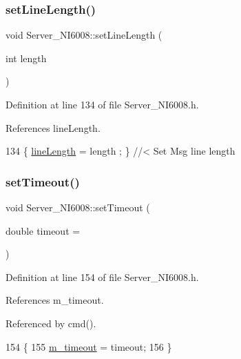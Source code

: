 \subsubsection{\texorpdfstring{set\+Line\+Length()}{setLineLength()}}
{\footnotesize\ttfamily void Server\+\_\+\+N\+I6008\+::set\+Line\+Length (\begin{DoxyParamCaption}\item[{int}]{length }\end{DoxyParamCaption})\hspace{0.3cm}{\ttfamily [inline]}}



Definition at line 134 of file Server\+\_\+\+N\+I6008.\+h.



References line\+Length.


\begin{DoxyCode}
134 \{ \hyperlink{classServer__NI6008_a88ff64de4d8715d849b06c2457d13e17}{lineLength} = length ; \} \textcolor{comment}{//< Set Msg line length}
\end{DoxyCode}
\mbox{\label{classServer__NI6008_ade018df1c5afac06e6d528536635ba48}} 
\subsubsection{\texorpdfstring{set\+Timeout()}{setTimeout()}}
{\footnotesize\ttfamily void Server\+\_\+\+N\+I6008\+::set\+Timeout (\begin{DoxyParamCaption}\item[{double}]{timeout = {} }\end{DoxyParamCaption})\hspace{0.3cm}{\ttfamily [inline]}}



Definition at line 154 of file Server\+\_\+\+N\+I6008.\+h.



References m\+\_\+timeout.



Referenced by cmd().


\begin{DoxyCode}
154                                         \{
155     \hyperlink{classServer__NI6008_a782b89c4483096900a3c02f1b1fc2c2f}{m\_timeout} = timeout;
156   \}  
\end{DoxyCode}
\mbox{\label{classServer__NI6008_ae3ac1bbf922a2475f41dfd97482af152}} 
